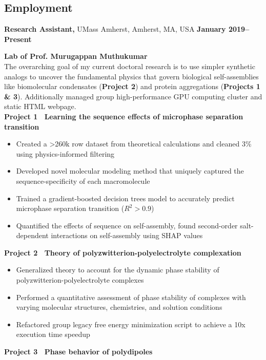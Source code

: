 \documentclass[margin,line]{res}
\begin{document}
\begin{resume}
	\section{\sc Employment}
	 {\bf Research Assistant,} UMass Amherst, Amherst, MA, USA
	\hfill {\bf January 2019--Present}
	\begin{adjustwidth}{1.5em}{0pt}
		{\bf Lab of Prof. Murugappan Muthukumar}\\
		The overarching goal of my current doctoral research is to use simpler
		synthetic analogs to uncover the fundamental physics that govern biological
		self-assemblies like biomolecular condensates ({\bf Project 2}) and protein
		aggregations ({\bf Projects 1 \& 3}). Additionally managed group
		high-performance GPU computing cluster and static HTML webpage.
		\\
		{\bf Project 1~\textendash{} Learning the sequence effects of microphase
		separation transition}
		\begin{itemize}
			\item Created a >260k row dataset from theoretical calculations and
			      cleaned 3\% using physics-informed filtering
			\item Developed novel molecular modeling method that uniquely captured
			      the sequence-specificity of each macromolecule
			\item Trained a gradient-boosted decision trees model to accurately
			      predict microphase separation transition ($R^{2} > 0.9$)
			\item Quantified the effects of sequence on self-assembly, found
			      second-order salt-dependent interactions on self-assembly using SHAP
			      values
		\end{itemize}
		{\bf Project 2~\textendash{} Theory of polyzwitterion-polyelectrolyte
		complexation}
		\begin{itemize}
			\item Generalized theory to account for the dynamic phase stability of
			      polyzwitterion-polyelectrolyte complexes
			\item Performed a quantitative assessment of phase stability of complexes
			      with varying molecular structures, chemistries, and solution conditions
			\item Refactored group legacy free energy minimization script to
			      achieve a 10x execution time speedup
		\end{itemize}
		{\bf Project 3~\textendash{} Phase behavior of polydipoles}
		\begin{itemize}

\end{itemize}
\end{adjustwidth}
\end{resume}
\end{document}
